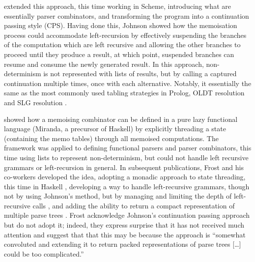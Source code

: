 \citet{Johnson1995} extended this approach, this time working in Scheme, introducing
what are essentially parser combinators, and transforming the program into
a continuation passing style (CPS). Having done this, Johnson showed how the memoisation
process could accommodate left-recursion by effectively suspending the branches of the
computation which are left recursive and allowing the other branches to proceed until
they produce a result, at which point, suspended branches can resume and consume
the newly generated result. In this approach, non-determinism is not represented with
lists of results, but by calling a captured continuation multiple times, once with
each alternative. Notably, it essentially the same as the most commonly used tabling
strategies in Prolog, OLDT resolution \citep{TamakiSato1986} and SLG resolution \cite{ChenWarren1993}.

\citet{Frost1994}
showed how a memoising combinator can be defined in a 
pure lazy functional language (Miranda, a precursor of Haskell) by explicitly
threading a state (containing the memo tables) through all memoised computations.
The framework was applied to defining functional parsers and parser combinators,
this time using lists to represent non-determinism, but could not handle left 
recursive grammars or left-recursion in general. In subsequent publications,
Frost and his co-workers developed the idea, adopting a monadic approach to state threading,
this time in Haskell \cite{Frost2003}, developing a way to handle left-recursive
grammars, though not by using Johnson's method, but by managing and limiting the depth 
of left-recursive calls \cite{FrostHafiz2006}, and adding the ability to return
a compact representation of multiple parse trees \cite{FrostHafizCallaghan2007,FrostHafizCallaghan2008}.
Frost \etal acknowledge Johnson's continuation passing approach but do not adopt it;
indeed, they express surprise that it has not received much attention and suggest
that that this may be because the approach is ``somewhat convoluted and extending 
it to return packed representations of parse trees [\ldots] could be too complicated.''


